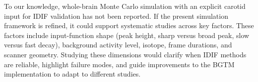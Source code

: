 To our knowledge, whole-brain Monte Carlo simulation with an explicit carotid input for IDIF validation has not been reported.
If the present simulation framework is refined, it could support systematic studies across key factors.
These factors include input-function shape (peak height, sharp versus broad peak, slow versus fast decay), background activity level, isotope, frame durations, and scanner geometry.
Studying these dimensions would clarify when IDIF methods are reliable, highlight failure modes, and guide improvements to the BGTM implementation to adapt to different studies. %


